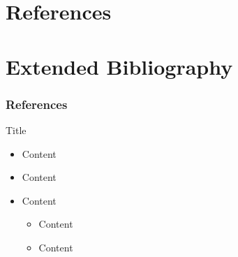 {
\section{References}
\section{Extended Bibliography}
\tiny
\begin{frame}
  \frametitle{References}
  
  
\end{frame}
}



\begin{frame}{Title}
  \begin{itemize}
    \item Content
    \vspace{\baselineskip}
    \item Content
    \vspace{\baselineskip}
    \item Content
    \begin{itemize}
       \item Content
       \item Content
     \end{itemize}
  \end{itemize}
\end{frame}
